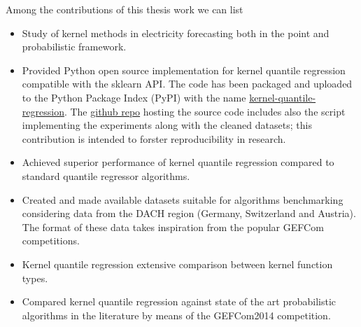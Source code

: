 Among the contributions of this thesis work we can list
\begin{itemize}
    \item Study of kernel methods in electricity forecasting both in the point and probabilistic framework.
    \item Provided Python open source implementation for kernel quantile regression compatible with the sklearn API. The code has been packaged and uploaded to the Python Package Index (PyPI) with the name \href{https://pypi.org/project/kernel-quantile-regression/#2}{kernel-quantile-regression}. The \href{https://github.com/luca-pernigo/kernel_quantile_regression}{github repo} hosting the source code includes also the script implementing the experiments along with the cleaned datasets; this contribution is intended to forster reproducibility in research.
    \item Achieved superior performance of kernel quantile regression compared to standard quantile regressor algorithms. 
    \item Created and made available datasets suitable for algorithms benchmarking considering data from the DACH region (Germany, Switzerland and Austria). The format of these data takes inspiration from the popular GEFCom competitions.
    \item Kernel quantile regression extensive comparison between kernel function types.
    \item Compared kernel quantile regression against state of the art probabilistic algorithms in the literature by means of the GEFCom2014 competition.
\end{itemize}


